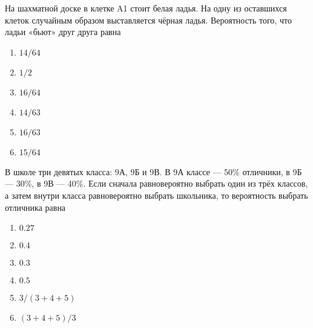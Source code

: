 \documentclass[t]{beamer}
\begin{document}
 \begin{frame} \label{3} 
\begin{block}{3} 

  На шахматной доске в клетке A1 стоит белая ладья. На одну из оставшихся клеток случайным образом выставляется чёрная ладья. Вероятность того, что ладьи «бьют» друг друга равна
  
 \end{block} 
\begin{enumerate} 
\item[] \hyperlink{3-No}{\beamergotobutton{} $14/64$}
\item[] \hyperlink{3-No}{\beamergotobutton{} $1/2$}
\item[] \hyperlink{3-No}{\beamergotobutton{} $16/64$}
\item[] \hyperlink{3-Yes}{\beamergotobutton{} $14/63$}
\item[] \hyperlink{3-No}{\beamergotobutton{} $16/63$}
\item[] \hyperlink{3-No}{\beamergotobutton{} $15/64$}
\end{enumerate} 
\end{frame} 


 \begin{frame} \label{4} 
\begin{block}{4} 

  В школе три девятых класса: 9А, 9Б и 9В. В 9А классе — 50\% отличники, в 9Б — 30\%, в 9В — 40\%. Если сначала равновероятно выбрать один из трёх классов, а затем внутри класса равновероятно выбрать школьника, то вероятность выбрать отличника равна
  


 \end{block} 
\begin{enumerate} 
\item[] \hyperlink{4-No}{\beamergotobutton{} $0.27$}
\item[] \hyperlink{4-Yes}{\beamergotobutton{} $0.4$}
\item[] \hyperlink{4-No}{\beamergotobutton{} $0.3$}
\item[] \hyperlink{4-No}{\beamergotobutton{} $0.5$}
\item[] \hyperlink{4-No}{\beamergotobutton{} $3/(3+4+5)$}
\item[] \hyperlink{4-No}{\beamergotobutton{} $(3+4+5)/3$}
\end{enumerate} 
\end{frame} 
\end{document}
